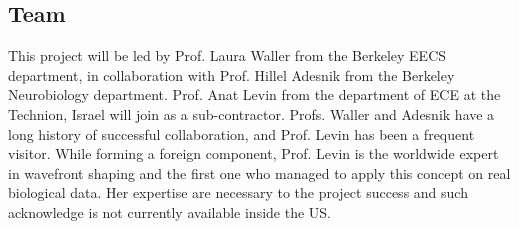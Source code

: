  
% 
%  
%
%




\subsection{Team}
This project will be led by Prof. Laura Waller from the Berkeley EECS department, in collaboration with Prof. Hillel Adesnik from the Berkeley Neurobiology department. Prof. Anat Levin from the department of ECE at the Technion, Israel will join as a sub-contractor. Profs. Waller and Adesnik have a long history of successful collaboration, and Prof. Levin has been a frequent visitor.
While forming a foreign component, Prof. Levin is the worldwide expert in wavefront shaping and the first one who managed to apply this concept on real biological data. Her expertise are necessary to the project success and such acknowledge is not currently available inside the US.    